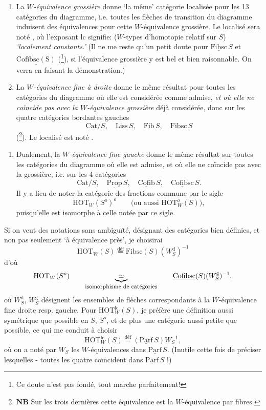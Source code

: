 \documentclass[11pt]{article}
\newcommand{\printedpage}[1]{\marginpar{\footnotesize p.~#1}}
\newcommand{\msp}[1]{\marginpar{\footnotesize [#1]}}
\newcommand{\Cat}{\mathrm{Cat}}
\newcommand{\uc}[1]{\underline{\mathrm{#1}}}
\newcommand{\HOT}{\mathrm{HOT}}
\newcommand{\defeq}{\overset{\text{déf}}{=}}
\begin{document}
\begin{enumerate}[leftmargin=*]
\item[$1^o$)] La \textit{$W$-équivalence grossière} donne `la même' catégorie localisée pour les 13 catégories du diagramme, i.e. toutes les flèches de transition du diagramme induisent des équivalences pour cette $W$-équivalence grossière. Le localisé sera noté \fbox{$\HOT^{\mathrm{lc}}_W(S)$}, où l'exposant lc signifie: ($W$-types d'homotopie relatif sur $S$) \textit{`localement constants.'} (Il ne me reste qu'un petit doute pour $\uc{Fibsc}\,S$ et $\uc{Cofibsc(S)}$ (\footnote[34]{Ce doute n'est pas fondé, tout marche parfaitement!}), si l'équivalence grossière y est bel et bien raisonnable. On verra en faisant la démonstration.)

\item[$2^o$)] La \textit{$W$-équivalence fine à droite} donne le même résultat pour toutes les catégories du diagramme où elle est considérée comme admise, \textit{et où elle ne coïncide pas avec la $W$-équivalence grossière} déjà considérée, donc sur les quatre catégories bordantes gauches
\[
\Cat/S,\quad \uc{Liss}\,S,\quad \uc{Fib}\,S,\quad \uc{Fibsc}\,S
\]
(\footnote[35]{\textbf{NB} Sur les trois dernières cette équivalence est la $W$-équivalence par fibres.}). Le localisé est noté \fbox{$\HOT_W(S)$}.
\end{enumerate}

\msp{page 50}

\printedpage{31}

\begin{enumerate}[leftmargin=*]
\item[$2'^o$)] Dualement, la \textit{$W$-équivalence fine gauche} donne le même résultat sur toutes les catégories du diagramme où elle est admise, et où elle ne coïncide pas avec la grossière, i.e. sur les 4 catégories
\[
\Cat/S,\quad \uc{Prop}\,S,\quad \uc{Cofib}\,S,\quad \uc{Cofibsc}\,S.
\]
Il y a lieu de noter la catégorie des fractions commune par le sigle
\[
\HOT_W(S^o)^o \qquad \text{(ou aussi $\HOT^o_W(S)$)},
\]
puisqu'elle est isomorphe à celle notée par ce sigle.
\end{enumerate}

Si on veut des notations sans ambiguïté, désignant des catégories bien définies, et non pas seulement `à équivalence près', je choisirai
\[
\HOT_W(S) \defeq \uc{Fibsc}(S)(W^{\mathrm{d}}_S)^{-1}
\]
d'où
\[
\HOT_W(S^o) \qquad \underbrace{\simeq}_{\text{\footnotesize isomorphisme de catégories}} \qquad \uc{Cofibsc}(S)(W^{\mathrm{g}}_S)^{-1},
\]
où $W^{\mathrm{d}}_S$, $W^{\mathrm{g}}_S$ désignent les ensembles de flèches correspondants à la $W$-équivalence fine droite resp. gauche. Pour $\HOT^{\mathrm{lc}}_W(S)$, je préfère une définition aussi symétrique que possible en $S$, $S^o$, et de plus une catégorie aussi petite que possible, ce qui me conduit à choisir
\[
\HOT^{\mathrm{lc}}_W(S) \defeq (\uc{Parf}\,S)W^{-1}_S,
\]
où on a noté par $W_S$ les $W$-équivalences dans $\uc{Parf}\,S$. (Inutile cette fois de préciser lesquelles - toutes les quatre coïncident dans $\uc{Parf}\,S$ !)
\end{document}
